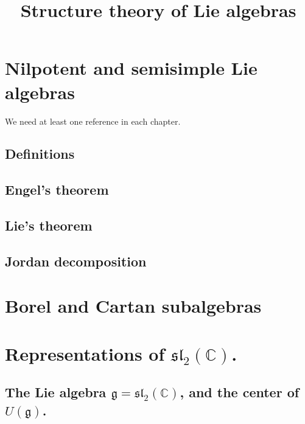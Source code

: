 

%


\title{Structure theory of Lie algebras}


\maketitle

\label{section-phantom}

\tableofcontents


\section{Nilpotent and semisimple Lie algebras}

We need at least one reference \cite{reference} in each chapter.

\subsection{Definitions}

\subsection{Engel's theorem}

\subsection{Lie's theorem}

\subsection{Jordan decomposition}

\section{Borel and Cartan subalgebras}


\section{Representations of $\mathfrak{sl}_2(\mathbb C)$.}

\subsection{The Lie algebra $\mathfrak g=\mathfrak{sl}_2(\mathbb C)$, and the center of $U(\mathfrak g)$.}

